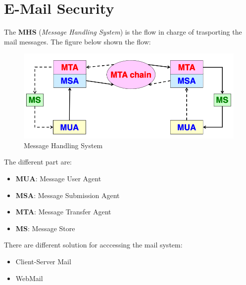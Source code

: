 \documentclass[12pt]{article}
\begin{document}
\section{E-Mail Security}
The \textbf{MHS} (\textit{Message Handling System}) is the flow in charge of trasporting the mail messages. The figure below shown the flow:
\begin{figure}[H]
   \centering
   \includegraphics[width=\linewidth]{images/MHS.png}
   \caption{Message Handling System}
   \label{fig:MHS}
\end{figure}
The different part are:
\begin{itemize}
  \item \textbf{MUA}: Message User Agent
  \item \textbf{MSA}: Message Submission Agent
  \item \textbf{MTA}: Message Transfer Agent
  \item \textbf{MS}: Message Store
\end{itemize}
There are different solution for acccessing the mail system:
\begin{itemize}
  \item Client-Server Mail
  \item WebMail
\end{itemize}
\end{document}
